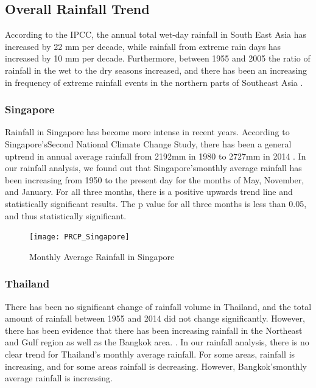 
\subsection{Overall Rainfall Trend}
According to the IPCC, the annual total wet-day rainfall in South East Asia has increased by 22 mm per decade, while rainfall from extreme rain days has increased by 10 mm per decade. Furthermore, between 1955 and 2005 the ratio of rainfall in the wet to the dry seasons increased, and there has been an increasing in frequency of extreme rainfall events in the northern parts of Southeast Asia \citep{TBD}.

\subsubsection{Singapore}
Rainfall in Singapore has become more intense in recent years. According to Singapore'sSecond National Climate Change Study, there has been a general uptrend in annual average rainfall from 2192mm in 1980 to 2727mm in 2014 \citep{singaporeclimatechange}. In our rainfall analysis, we found out that  Singapore'smonthly average rainfall has been increasing from 1950 to the present day for the months of May, November, and January. For all three months, there is a positive upwards trend line and statistically significant results. The p value for all three months is less than 0.05, and thus statistically significant.   

\begin{figure}[h!]
\centering
  \texttt{[image: PRCP\_Singapore]}
  \caption{Monthly Average Rainfall in Singapore}
  \label{fig:PCRP_singapore}
\end{figure}


\subsubsection{Thailand} 
There has been no significant change of rainfall volume in Thailand, and the total amount of rainfall between 1955 and 2014 did not change significantly. However, there has been evidence that there has been increasing rainfall in the Northeast and Gulf region as well as the Bangkok area. \citep{bkkweather}. In our rainfall analysis, there is no clear trend for Thailand's monthly average rainfall. For some areas, rainfall is increasing, and for some areas rainfall is decreasing. However, Bangkok'smonthly average rainfall is increasing. 

